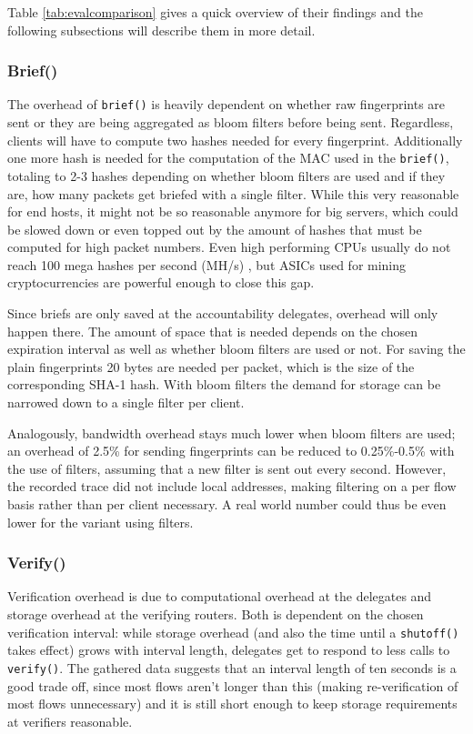 \documentclass{acm_proc_article-sp}
\begin{document}
Table \ref{tab:evalcomparison} gives a quick overview of their findings and the following subsections will describe them in more detail.

\subsubsection{Brief()}
The overhead of \texttt{brief()} is heavily dependent on whether raw fingerprints are sent or they are being aggregated as bloom filters before being sent. Regardless, clients will have to compute two hashes needed for every fingerprint. Additionally one more hash is needed for the computation of the MAC used in the \texttt{brief()}, totaling to 2-3 hashes depending on whether bloom filters are used and if they are, how many packets get briefed with a single filter. While this very reasonable for end hosts, it might not be so reasonable anymore for big servers, which could be slowed down or even topped out by the amount of hashes that must be computed for high packet numbers. Even high performing CPUs usually do not reach 100 mega hashes per second (MH/s) \cite{hashes}, but ASICs used for mining cryptocurrencies are powerful enough to close this gap.

Since briefs are only saved at the accountability delegates, overhead will only happen there. The amount of space that is needed depends on the chosen expiration interval as well as whether bloom filters are used or not. For saving the plain fingerprints 20 bytes are needed per packet, which is the size of the corresponding SHA-1 hash. With bloom filters the demand for storage can be narrowed down to a single filter per client.

Analogously, bandwidth overhead stays much lower when bloom filters are used; an overhead of 2.5\% for sending fingerprints can be reduced to 0.25\%-0.5\% with the use of filters, assuming that a new filter is sent out every second. However, the recorded trace did not include local addresses, making filtering on a per flow basis rather than per client necessary. A real world number could thus be even lower for the variant using filters.

\subsubsection{Verify()}
Verification overhead is due to computational overhead at the delegates and storage overhead at the verifying routers. Both is dependent on the chosen verification interval: while storage overhead (and also the time until a \texttt{shutoff()} takes effect) grows with interval length, delegates get to respond to less calls to \texttt{verify()}. The gathered data suggests that an interval length of ten seconds is a good trade off, since most flows aren't longer than this (making re-verification of most flows unnecessary) and it is still short enough to keep storage requirements at verifiers reasonable.
\end{document}
